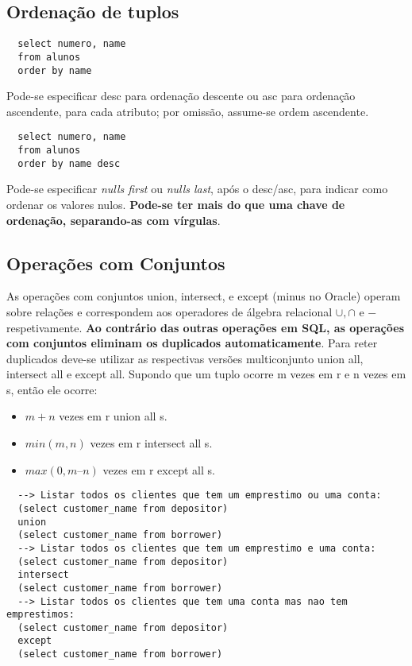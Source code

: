 \documentclass{article}
\begin{document}
\subsection{Ordenação de tuplos}
\begin{lstlisting}
  select numero, name
  from alunos
  order by name
\end{lstlisting}
Pode-se especificar desc para ordenação descente ou asc para ordenação ascendente, para cada atributo; por omissão, assume-se ordem ascendente.
\begin{lstlisting}
  select numero, name
  from alunos
  order by name desc
\end{lstlisting}
Pode-se especificar \textit{nulls first} ou \textit{nulls last}, após o desc/asc, para indicar como ordenar os valores nulos. \textbf{Pode-se ter mais do que uma chave de ordenação, separando-as com vírgulas}.

\subsection{Operações com Conjuntos}
As operações com conjuntos union, intersect, e except (minus no Oracle) operam sobre relações e correspondem aos operadores de álgebra relacional $\cup, \cap$ e $-$ respetivamente. \textbf{Ao contrário das outras operações em SQL, as operações com conjuntos eliminam os duplicados automaticamente}. Para reter duplicados deve-se utilizar as respectivas versões multiconjunto union all, intersect all e except all.
Supondo que um tuplo ocorre m vezes em r e n vezes em s, então ele ocorre:
\begin{itemize}
  \item $m+n$ vezes em r union all s.
  \item $min(m,n)$ vezes em r intersect all s.
  \item $max(0,m–n)$ vezes em r except all s.
\end{itemize}
\begin{lstlisting}
  --> Listar todos os clientes que tem um emprestimo ou uma conta:
  (select customer_name from depositor)
  union
  (select customer_name from borrower)
  --> Listar todos os clientes que tem um emprestimo e uma conta:
  (select customer_name from depositor)
  intersect
  (select customer_name from borrower)
  --> Listar todos os clientes que tem uma conta mas nao tem emprestimos:
  (select customer_name from depositor)
  except
  (select customer_name from borrower)
\end{lstlisting}
\end{document}
